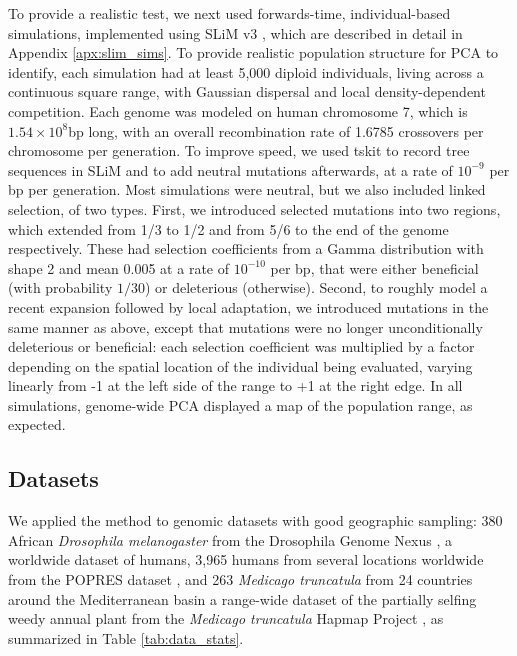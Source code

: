 \documentclass[11pt, oneside]{article}   	%
\newcommand\citep{\cite}
\begin{document}
To provide a realistic test,
we next used forwards-time, individual-based simulations, implemented using SLiM v3 \citep{haller2017flexible},
which are described in detail in Appendix \ref{apx:slim_sims}.
To provide realistic population structure for PCA to identify,
each simulation had at least 5,000 diploid individuals,   
living across a continuous square range,
with Gaussian dispersal and local density-dependent competition.
Each genome was modeled on human chromosome 7, which is $1.54 \times 10^8$bp long,
with an overall recombination rate of 1.6785 crossovers per chromosome per generation.
To improve speed, we used tskit \citep{kelleher2018efficient} to record tree sequences 
in SLiM \citep{haller2018treesequence}
and to add neutral mutations afterwards, at a rate of $10^{-9}$ per bp per generation.
Most simulations were neutral, but we also included linked selection, of two types.
First, %
we introduced selected mutations into two regions, 
which extended from 1/3 to 1/2 and from 5/6 to the end of the genome respectively.
These had selection coefficients from a Gamma distribution with shape 2 and mean 0.005
at a rate of $10^{-10}$ per bp, that were either beneficial (with probability $1/30$)
or deleterious (otherwise).
Second, %
to roughly model a recent expansion followed by local adaptation,
we introduced mutations in the same manner as above,
except that mutations were no longer unconditionally deleterious or beneficial:
each selection coefficient was multiplied by a factor depending on the spatial location
of the individual being evaluated, varying linearly from -1 at the left side of the range
to +1 at the right edge.
In all simulations, genome-wide PCA displayed a map of the population range, as expected.


\subsection{Datasets}

We applied the method to genomic datasets with good geographic sampling:
380 African \textit{Drosophila melanogaster} from the Drosophila Genome Nexus \citep{lack2015drosophila},
a worldwide dataset of humans,
3,965 humans from several locations worldwide from the POPRES dataset \citep{nelson2008population},
and 263 \textit{Medicago truncatula} from 24 countries around the Mediterranean basin 
a range-wide dataset of the partially selfing weedy annual plant 
from the \textit{Medicago truncatula} Hapmap Project \citep{tang2014improved},
as summarized in Table \ref{tab:data_stats}.
\end{document}
